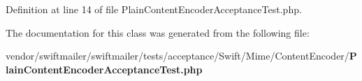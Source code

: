 Definition at line 14 of file Plain\+Content\+Encoder\+Acceptance\+Test.\+php.



The documentation for this class was generated from the following file\+:\begin{DoxyCompactItemize}
\item 
vendor/swiftmailer/swiftmailer/tests/acceptance/\+Swift/\+Mime/\+Content\+Encoder/{\bf Plain\+Content\+Encoder\+Acceptance\+Test.\+php}\end{DoxyCompactItemize}
